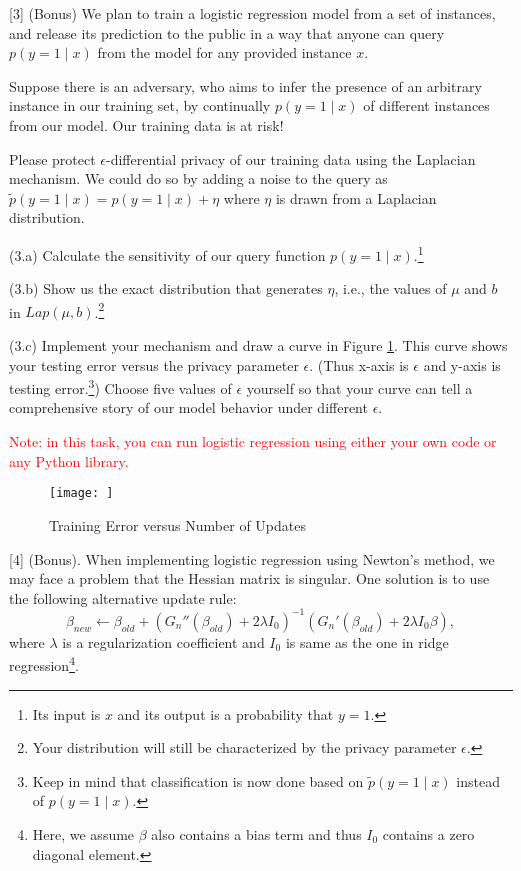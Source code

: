 \documentclass{llncs}
\begin{document}
\newpage 

[3] (Bonus) We plan to train a logistic regression 
model from a set of instances, and release its
prediction to the public in a way that anyone can 
query $p(y = 1 \mid x)$ from the model for any 
provided instance $x$. 

Suppose there is an adversary, who aims to infer 
the presence of an arbitrary instance in our training 
set, by continually $p(y = 1 \mid x)$ of different 
instances from our model. Our training data is at risk! 

Please protect $\epsilon$-differential privacy of 
our training data using the Laplacian mechanism.
We could do so by adding a noise to the query as 
$\tilde{p}(y = 1 \mid x) = p(y = 1 \mid x) + \eta$ 
where $\eta$ is drawn from a Laplacian distribution. 

(3.a) Calculate the sensitivity of our query 
function $p(y = 1 \mid x)$.\footnote{Its input is 
$x$ and its output is a probability that $y = 1$.} 

(3.b) Show us the exact distribution that 
generates $\eta$, i.e., the values 
of $\mu$ and $b$ in $Lap(\mu, b)$.\footnote{Your 
distribution will still be characterized by the 
privacy parameter $\epsilon$.}  

(3.c) Implement your mechanism and draw 
a curve in Figure \ref{hw12_fig2}. 
This curve shows your testing error 
versus the privacy parameter $\epsilon$. (Thus x-axis 
is $\epsilon$ and y-axis is testing error.\footnote{Keep 
in mind that classification is now done based on 
$\tilde{p}(y=1 \mid x)$ instead of $p(y=1 \mid x)$.}) 
Choose five 
values of $\epsilon$ yourself so that your curve can 
tell a comprehensive story of our model behavior under 
different $\epsilon$. 

\textcolor{red}{Note: in this task, 
you can run logistic regression using either 
your own code or any Python library.}

\begin{figure}[h!] 
\centering 
\texttt{[image: ]} 
\caption{Training Error versus 
Number of Updates} 
\label{hw12_fig2}
\end{figure}

\newpage 

[4] (Bonus). When implementing logistic regression 
using Newton's method, we may face a problem 
that the Hessian matrix is singular. 
One solution is to use the following 
alternative update rule: 
\begin{equation}
\label{eq:hw12_t4}
\beta_{new} \leftarrow \beta_{old} + 
(G_{n}''(\beta_{old}) + 2 \lambda I_{0})^{-1} 
(G_{n}'(\beta_{old}) + 2 \lambda I_{0} \beta),  
\end{equation}
where $\lambda$ is a regularization coefficient 
and $I_{0}$ is same as the one in ridge regression\footnote{Here, we assume $\beta$ also 
contains a bias term and thus $I_{0}$ contains 
a zero diagonal element.}. 
\end{document}

